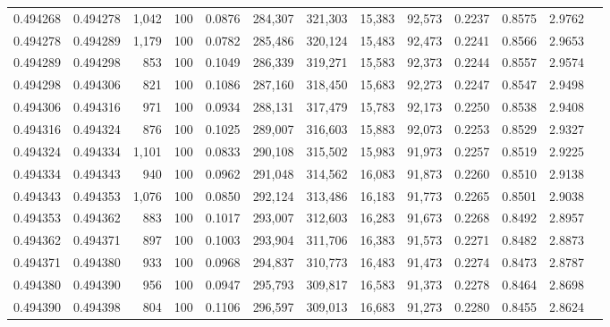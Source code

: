 \begin{tabular}{rrrrrrrrrrrrr}
0.494268 & 0.494278 & 1,042 & 100 &                                     0.0876 & 284,307 & 321,303 &  15,383 &  92,573 & 0.2237 & 0.8575 & 2.9762 \\
0.494278 & 0.494289 & 1,179 & 100 &                                     0.0782 & 285,486 & 320,124 &  15,483 &  92,473 & 0.2241 & 0.8566 & 2.9653 \\
0.494289 & 0.494298 &   853 & 100 &                                     0.1049 & 286,339 & 319,271 &  15,583 &  92,373 & 0.2244 & 0.8557 & 2.9574 \\
0.494298 & 0.494306 &   821 & 100 &                                     0.1086 & 287,160 & 318,450 &  15,683 &  92,273 & 0.2247 & 0.8547 & 2.9498 \\
0.494306 & 0.494316 &   971 & 100 &                                     0.0934 & 288,131 & 317,479 &  15,783 &  92,173 & 0.2250 & 0.8538 & 2.9408 \\
0.494316 & 0.494324 &   876 & 100 &                                     0.1025 & 289,007 & 316,603 &  15,883 &  92,073 & 0.2253 & 0.8529 & 2.9327 \\
0.494324 & 0.494334 & 1,101 & 100 &                                     0.0833 & 290,108 & 315,502 &  15,983 &  91,973 & 0.2257 & 0.8519 & 2.9225 \\
0.494334 & 0.494343 &   940 & 100 &                                     0.0962 & 291,048 & 314,562 &  16,083 &  91,873 & 0.2260 & 0.8510 & 2.9138 \\
0.494343 & 0.494353 & 1,076 & 100 &                                     0.0850 & 292,124 & 313,486 &  16,183 &  91,773 & 0.2265 & 0.8501 & 2.9038 \\
0.494353 & 0.494362 &   883 & 100 &                                     0.1017 & 293,007 & 312,603 &  16,283 &  91,673 & 0.2268 & 0.8492 & 2.8957 \\
0.494362 & 0.494371 &   897 & 100 &                                     0.1003 & 293,904 & 311,706 &  16,383 &  91,573 & 0.2271 & 0.8482 & 2.8873 \\
0.494371 & 0.494380 &   933 & 100 &                                     0.0968 & 294,837 & 310,773 &  16,483 &  91,473 & 0.2274 & 0.8473 & 2.8787 \\
0.494380 & 0.494390 &   956 & 100 &                                     0.0947 & 295,793 & 309,817 &  16,583 &  91,373 & 0.2278 & 0.8464 & 2.8698 \\
0.494390 & 0.494398 &   804 & 100 &                                     0.1106 & 296,597 & 309,013 &  16,683 &  91,273 & 0.2280 & 0.8455 & 2.8624 \\

\end{tabular}
